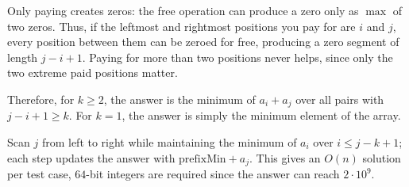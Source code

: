 Only paying creates zeros: the free operation can produce a zero only as $\max$ of two zeros. Thus, if the leftmost and rightmost positions you pay for are $i$ and $j$, every position between them can be zeroed for free, producing a zero segment of length $j - i + 1$. Paying for more than two positions never helps, since only the two extreme paid positions matter.

Therefore, for $k \ge 2$, the answer is the minimum of $a_i + a_j$ over all pairs with $j - i + 1 \ge k$. For $k = 1$, the answer is simply the minimum element of the array.

Scan $j$ from left to right while maintaining the minimum of $a_i$ over $i \le j - k + 1$; each step updates the answer with $\text{prefixMin} + a_j$. This gives an $O(n)$ solution per test case, $64$-bit integers are required since the answer can reach $2 \cdot 10^9$.
